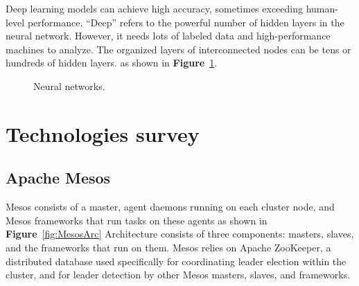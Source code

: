 \documentclass[12pt,oneside,openright,a4paper]{cpe-english-project}
\begin{document}
\hspace{10mm}Deep learning models can achieve high accuracy, sometimes exceeding human-level performance. “Deep” refers to the powerful number of hidden layers in the neural network.  However, it needs lots of labeled data and high-performance machines to analyze. The organized layers of interconnected nodes can be tens or hundreds of hidden layers. \cite{deepLearning2} as shown in \textbf{Figure}~\ref{fig:NN}.

\begin{figure}[!h]\centering
  \setlength{\fboxrule}{0mm} %
  \setlength{\fboxsep}{0cm}
  \caption{Neural networks.}\label{fig:NN}
\end{figure}

\newpage

\section{Technologies survey}  

\subsection{Apache Mesos}

\hspace{10mm}Mesos consists of a master, agent daemons running on each cluster node, and Mesos frameworks that run tasks on these agents as shown in \textbf{Figure}~\ref{fig:MesosArc} Architecture consists of three components: masters, slaves, and the frameworks that run on them. Mesos relies on Apache ZooKeeper, a distributed database used specifically for coordinating leader election within the cluster, and for leader detection by other Mesos masters, slaves, and frameworks. \cite{mesosInAction}
\end{document}
